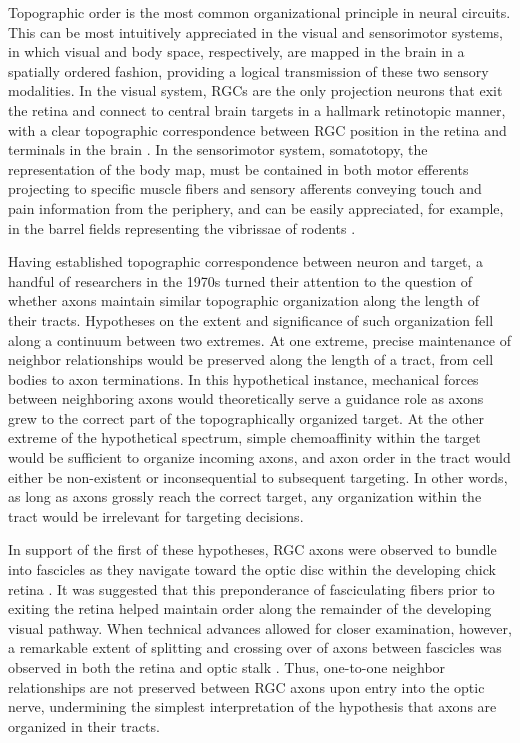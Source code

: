 Topographic order is the most common organizational principle in neural circuits.
This can be most intuitively appreciated in the visual and sensorimotor systems, in which visual and body space, respectively, are mapped in the brain in a spatially ordered fashion, providing a logical transmission of these two sensory modalities.
In the visual system, RGCs are the only projection neurons that exit the retina and connect to central brain targets in a hallmark retinotopic manner, with a clear topographic correspondence between RGC position in the retina and terminals in the brain \cite{lund1974organization}.
In the sensorimotor system, somatotopy, the representation of the body map, must be contained in both motor efferents projecting to specific muscle fibers and sensory afferents conveying touch and pain information from the periphery, and can be easily appreciated, for example, in the barrel fields representing the vibrissae of rodents \cite{woolsey1970structural}.

Having established topographic correspondence between neuron and target, a handful of researchers in the 1970s turned their attention to the question of whether axons maintain similar topographic organization along the length of their tracts.
Hypotheses on the extent and significance of such organization fell along a continuum between two extremes.
At one extreme, precise maintenance of neighbor relationships would be preserved along the length of a tract, from cell bodies to axon terminations.
In this hypothetical instance, mechanical forces between neighboring axons would theoretically serve a guidance role as axons grew to the correct part of the topographically organized target.
At the other extreme of the hypothetical spectrum, simple chemoaffinity within the target would be sufficient to organize incoming axons, and axon order in the tract would either be non-existent or inconsequential to subsequent targeting.
In other words, as long as axons grossly reach the correct target, any organization within the tract would be irrelevant for targeting decisions.

In support of the first of these hypotheses, RGC axons were observed to bundle into fascicles as they navigate toward the optic disc within the developing chick retina \cite{goldberg1972topographical}.
It was suggested that this preponderance of fasciculating fibers prior to exiting the retina helped maintain order along the remainder of the developing visual pathway. 
When technical advances allowed for closer examination, however, a remarkable extent of splitting and crossing over of axons between fascicles was observed in both the retina \cite{simon1991relationship} and optic stalk \cite{williams1985dispersion,simon1991relationship}.
Thus, one-to-one neighbor relationships are not preserved between RGC axons upon entry into the optic nerve, undermining the simplest interpretation of the hypothesis that axons are organized in their tracts.

